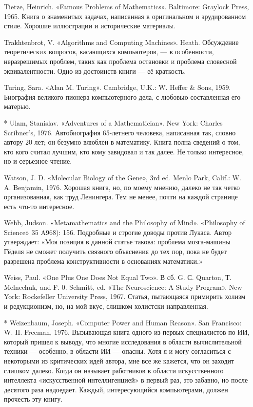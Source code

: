 Tietze, Heinrich. «Famous Problems of Mathematics». Baltimore: Graylock Press, 1965. Книга о знаменитых задачах, написанная в оригинальном и эрудированном стиле. Хорошие иллюстрации и исторические материалы.

Trakhtenbrot, V. «Algorithms and Computing Machines». Heath. Обсуждение теоретических вопросов, касающихся компьютеров, --- в особенности, неразрешимых проблем, таких как проблема остановки и проблема словесной эквивалентности. Одно из достоинств книги --- её краткость.

Turing, Sara. «Alan M. Turing». Cambridge, U.K.: W. Heffer \& Sons, 1959. Биография великого пионера компьютерного дела, с любовью составленная его матерью.

* Ulam, Stanislav. «Adventures of a Mathematician». New York: Charles Scribner's, 1976. Автобиография 65-летнего человека, написанная так, словно автору 20 лет; он безумно влюблен в математику. Книга полна сведений о том, кто кого считал лучшим, кто кому завидовал и так далее. Не только интересное, но и серьезное чтение.

Watson, J. D. «Molecular Biology of the Gene», 3rd ed. Menlo Park, Calif.: W. A. Benjamin, 1976. Хорошая книга, но, по моему мнению, далеко не так четко организованная, как труд Ленингера. Тем не менее, почти на каждой странице есть что-то интересное.

Webb, Judson. «Metamathematics and the Philosophy of Mind». «Philosophy of Science» 35 A968): 156. Подробные и строгие доводы против Лукаса. Автор утверждает: «Моя позиция в данной статье такова: проблема мозга-машины Гёделя не сможет получить связного объяснения до тех пор, пока не будет разрешена проблема конструктивности в основаниях математики.»

Weiss, Paul. «One Plus One Does Not Equal Two». В сб. G. С. Quarton, Т. Melnechuk, and F. 0. Schmitt, ed. «The Neuroscience: A Study Program». New York: Rockefeller University Press, 1967. Статья, пытающаяся примирить холизм и редукционизм, но, на мой вкус, слишком холистски направленная.

* Weizenbaum, Joseph. «Computer Power and Human Reason». San Francisco: W. H. Freeman, 1976. Вызывающая книга одного из первых специалистов по ИИ, который пришел к выводу, что многие исследования в области вычислительной техники --- особенно, в области ИИ --- опасны. Хотя я и могу согласиться с некоторыми из критических идей автора, мне все же кажется, что он заходит слишком далеко. Когда он называет работников в области искусственного интеллекта «искусственной интеллигенцией» в первый раз, это забавно, но после десятого раза надоедает. Каждый, интересующийся компьютерами, должен прочесть эту книгу.

